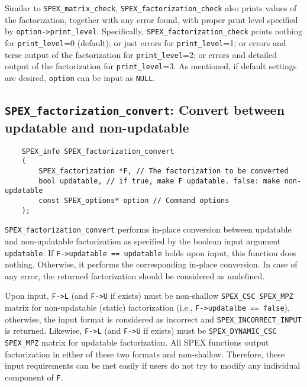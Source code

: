 \documentclass[12pt]{report}
\theoremstyle{definition}
\begin{document}
Similar to \verb|SPEX_matrix_check|, \verb|SPEX_factorization_check| also prints values of the factorization, together with any error found, with proper print level specified by
\verb|option->print_level|. Specifically, \verb|SPEX_factorization_check| prints nothing for \verb|print_level|=0 (default); or just errors for \verb|print_level|=1; or errors and terse output of the factorization for \verb|print_level|=2; or errors and detailed output of the factorization for \verb|print_level|=3.
As mentioned, if default settings are desired, \verb|option| can be input as \verb|NULL|. 

\subsection{\texttt{SPEX\_factorization\_convert}: Convert between updatable and non-updatable}\label{ss:spex_factorization_convert}

\begin{mdframed}[userdefinedwidth=6in]
{\footnotesize
\begin{verbatim}
    SPEX_info SPEX_factorization_convert
    (
        SPEX_factorization *F, // The factorization to be converted
        bool updatable, // if true, make F updatable. false: make non-updatable
        const SPEX_options* option // Command options
    ); 
\end{verbatim}
} \end{mdframed}


\verb|SPEX_factorization_convert| performs in-place conversion between updatable and
non-updatable factorization  as specified by the boolean
input argument \verb'updatable'. If \verb|F->updatable == updatable| holds upon input,
this function does nothing. Otherwise, it performs the corresponding
in-place conversion. In case of any error, the returned factorization should be considered as
undefined.

Upon input, \verb|F->L| (and \verb|F->U| if exists) must be non-shallow \verb|SPEX_CSC SPEX_MPZ| matrix for
non-updatable (static) factorization (i.e., \verb|F->updatalbe == false|),
otherwise, the input format is considered as incorrect and \verb|SPEX_INCORRECT_INPUT| is returned. Likewise, \verb|F->L| (and \verb|F->U|
if exists) must be \verb|SPEX_DYNAMIC_CSC SPEX_MPZ| matrix for updatable factorization. All
SPEX functions output factorization in either of these two formats and
non-shallow. Therefore, these input requirements can be met easily if users
do not try to modify any individual component of \verb|F|.
\end{document}
